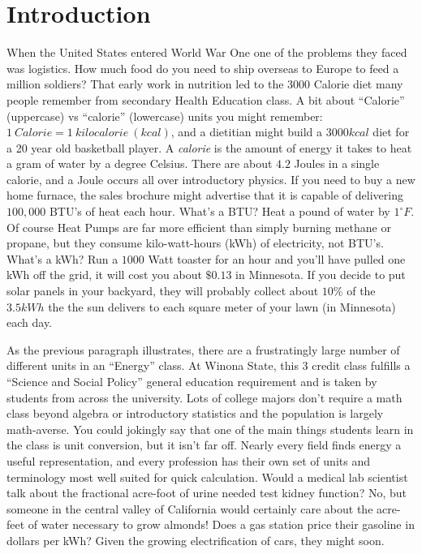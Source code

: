 \documentclass[prb,preprint]{revtex4-2}
\begin{document}
\section{Introduction}
When the United States entered World War One one of the problems they faced was logistics.  How much food do you need to ship overseas to Europe to feed a million soldiers?  That early work in nutrition led to the $3000$ Calorie diet many people remember from secondary Health Education class.  A bit about ``Calorie'' (uppercase) vs ``calorie'' (lowercase) units you might remember: $1~Calorie = 1~kilocalorie~(kcal)$, and a dietitian might build a $3000 kcal$ diet for a 20 year old basketball player.  A \textit{calorie} is the amount of energy it takes  to heat a gram of water by a degree Celsius.  There are about $4.2$ Joules in a single calorie, and a Joule occurs all over introductory  physics.  If you need to buy a new home furnace, the sales brochure might advertise that it is capable of delivering $100,000$ BTU's of heat each hour.  What's a BTU? Heat a pound of water by $1^{\circ}F$.  Of course Heat Pumps are far more efficient than simply burning methane or propane, but they consume kilo-watt-hours (kWh) of electricity, not BTU's.  What's a kWh?  Run a $1000$ Watt toaster for an hour and you'll have pulled one kWh off the grid, it will cost you about $\$0.13$ in Minnesota.  If you decide to put solar panels in your backyard, they will probably collect about $10\%$ of the $3.5kWh$ the  the sun delivers to each square meter of your lawn (in Minnesota) each day.  

As the previous paragraph illustrates, there are a frustratingly large number of different units in an ``Energy'' class.  At Winona State, this 3 credit class fulfills a ``Science and Social Policy'' general education requirement and is taken by students from across the university.   Lots of college majors don't require a math class beyond algebra or introductory statistics and the population is largely math-averse. You could jokingly say that one of the main things students learn in the class is unit conversion, but it isn't far off.  Nearly every field finds energy a useful representation, and every profession has their own set of units and terminology most well suited for quick calculation.  Would a medical lab scientist talk about the fractional acre-foot of urine needed test kidney function?  No, but someone in the central valley of California would certainly care about the acre-feet of water necessary to grow almonds!  Does a gas station price their gasoline in dollars per kWh? Given the growing electrification of cars, they might soon.
\end{document}
